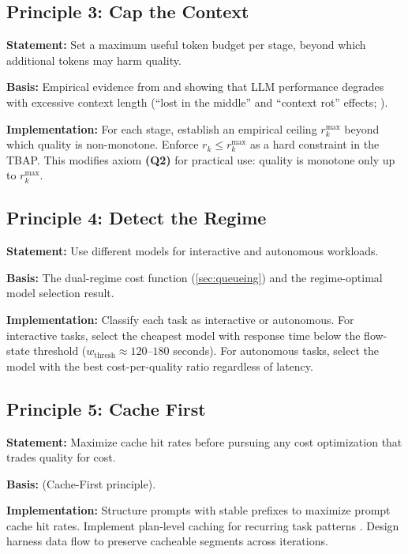 \documentclass[11pt, a4paper, copyright]{googledeepmind}
\begin{document}
\subsection{Principle 3: Cap the Context}

\textbf{Statement:} Set a maximum useful token budget per stage, beyond which additional tokens may harm quality.

\textbf{Basis:} Empirical evidence from \citet{gao2025context} and \citet{liu2024lost} showing that LLM performance degrades with excessive context length (``lost in the middle'' and ``context rot'' effects; \citealp{chroma2025rot}).

\textbf{Implementation:} For each stage, establish an empirical ceiling $r_k^{\max}$ beyond which quality is non-monotone. Enforce $r_k \leq r_k^{\max}$ as a hard constraint in the TBAP. This modifies axiom \textbf{(Q2)} for practical use: quality is monotone only up to $r_k^{\max}$.

\subsection{Principle 4: Detect the Regime}

\textbf{Statement:} Use different models for interactive and autonomous workloads.

\textbf{Basis:} The dual-regime cost function (\cref{sec:queueing}) and the regime-optimal model selection result.

\textbf{Implementation:} Classify each task as interactive or autonomous. For interactive tasks, select the cheapest model with response time below the flow-state threshold ($w_{\text{thresh}} \approx 120$--$180$ seconds). For autonomous tasks, select the model with the best cost-per-quality ratio regardless of latency.

\subsection{Principle 5: Cache First}

\textbf{Statement:} Maximize cache hit rates before pursuing any cost optimization that trades quality for cost.

\textbf{Basis:}  (Cache-First principle).

\textbf{Implementation:} Structure prompts with stable prefixes to maximize prompt cache hit rates. Implement plan-level caching for recurring task patterns \citep{zhang2025plancache}. Design harness data flow to preserve cacheable segments across iterations.
\end{document}
